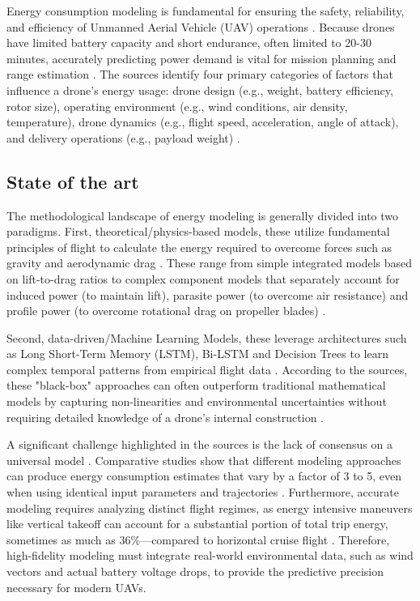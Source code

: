 Energy consumption modeling is fundamental for ensuring the safety, reliability, and efficiency of Unmanned Aerial Vehicle (UAV) operations \cite{ren2025, muli2022, zhang2021, dorling2017}. Because drones have limited battery capacity and short endurance, often limited to 20-30 minutes, accurately predicting power demand is vital for mission planning and range estimation \cite{ren2025, muli2022, conte2022, rodrigues2021}. The sources identify four primary categories of factors that influence a drone's energy usage: drone design (e.g., weight, battery efficiency, rotor size), operating environment (e.g., wind conditions, air density, temperature), drone dynamics (e.g., flight speed, acceleration, angle of attack), and delivery operations (e.g., payload weight) \cite{ren2025, muli2022, zhang2021, patterson2018}.

\subsection{State of the art}
The methodological landscape of energy modeling is generally divided into two paradigms. First, theoretical/physics-based models, these utilize fundamental principles of flight to calculate the energy required to overcome forces such as gravity and aerodynamic drag \cite{zhang2021, rodrigues2021}. These range from simple integrated models based on lift-to-drag ratios to complex component models that separately account for induced power (to maintain lift), parasite power (to overcome air resistance) and profile power (to overcome rotational drag on propeller blades) \cite{bruehl2021,zhang2021}.

Second, data-driven/Machine Learning Models, these leverage architectures such as Long Short-Term Memory (LSTM), Bi-LSTM and Decision Trees to learn complex temporal patterns from empirical flight data \cite{ren2025, muli2022, gora2022, fatima2022}. According to the sources, these "black-box" approaches can often outperform traditional mathematical models by capturing non-linearities and environmental uncertainties without requiring detailed knowledge of a drone's internal construction \cite{muli2022, gora2022}.

A significant challenge highlighted in the sources is the lack of consensus on a universal model \cite{muli2022, zhang2021}. Comparative studies show that different modeling approaches can produce energy consumption estimates that vary by a factor of 3 to 5, even when using identical input parameters and trajectories \cite{ren2025, muli2022, rodrigues2021}. Furthermore, accurate modeling requires analyzing distinct flight regimes, as energy intensive maneuvers like vertical takeoff can account for a substantial portion of total trip energy, sometimes as much as 36\%—compared to horizontal cruise flight \cite{rodrigues2022}. Therefore, high-fidelity modeling must integrate real-world environmental data, such as wind vectors and actual battery voltage drops, to provide the predictive precision necessary for modern UAVs.


